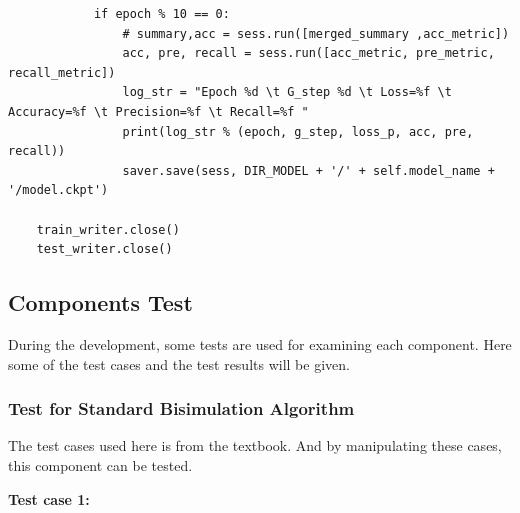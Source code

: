 \begin{code}
\begin{verbatim}
            if epoch % 10 == 0:
                # summary,acc = sess.run([merged_summary ,acc_metric])
                acc, pre, recall = sess.run([acc_metric, pre_metric, recall_metric])
                log_str = "Epoch %d \t G_step %d \t Loss=%f \t Accuracy=%f \t Precision=%f \t Recall=%f "
                print(log_str % (epoch, g_step, loss_p, acc, pre, recall))
                saver.save(sess, DIR_MODEL + '/' + self.model_name + '/model.ckpt')

    train_writer.close()
    test_writer.close()
\end{verbatim}
\end{code}


\newpage
\subsection{Components Test}
\label{sec:comptest}
During the development, some tests are used for examining each component.
Here some of the test cases and the test results will be given.

\subsubsection{Test for Standard Bisimulation Algorithm}
The test cases used here is from the textbook.
And by manipulating these cases, this component can be tested.

\vspace{+0.2em}
\noindent\textbf{Test case 1:}

